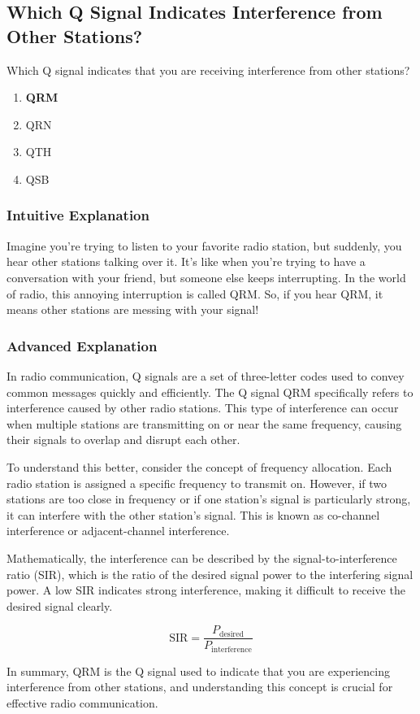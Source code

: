 \subsection{Which Q Signal Indicates Interference from Other Stations?}
\label{T2B10}

\begin{tcolorbox}[colback=gray!10!white,colframe=black!75!black,title=T2B10]
Which Q signal indicates that you are receiving interference from other stations?
\begin{enumerate}[label=\Alph*)]
    \item \textbf{QRM}
    \item QRN
    \item QTH
    \item QSB
\end{enumerate}
\end{tcolorbox}

\subsubsection{Intuitive Explanation}
Imagine you're trying to listen to your favorite radio station, but suddenly, you hear other stations talking over it. It's like when you're trying to have a conversation with your friend, but someone else keeps interrupting. In the world of radio, this annoying interruption is called QRM. So, if you hear QRM, it means other stations are messing with your signal!

\subsubsection{Advanced Explanation}
In radio communication, Q signals are a set of three-letter codes used to convey common messages quickly and efficiently. The Q signal QRM specifically refers to interference caused by other radio stations. This type of interference can occur when multiple stations are transmitting on or near the same frequency, causing their signals to overlap and disrupt each other.

To understand this better, consider the concept of frequency allocation. Each radio station is assigned a specific frequency to transmit on. However, if two stations are too close in frequency or if one station's signal is particularly strong, it can interfere with the other station's signal. This is known as co-channel interference or adjacent-channel interference.

Mathematically, the interference can be described by the signal-to-interference ratio (SIR), which is the ratio of the desired signal power to the interfering signal power. A low SIR indicates strong interference, making it difficult to receive the desired signal clearly.

\[ \text{SIR} = \frac{P_{\text{desired}}}{P_{\text{interference}}} \]

In summary, QRM is the Q signal used to indicate that you are experiencing interference from other stations, and understanding this concept is crucial for effective radio communication.

